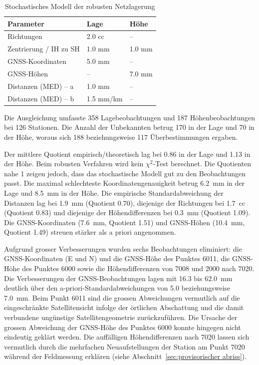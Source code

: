 \begin{table}[H]
    \centering
    \begin{tabularx}{\textwidth}{p{5.5cm} X X}
        \toprule
        Parameter & Lage & Höhe \\
        \midrule
        Richtungen & 2.0 cc & -- \\
        \addlinespace
        Zentrierung / IH zu SH & 1.0 mm & 1.0 mm \\
        \addlinespace
        GNSS-Koordinaten & 5.0 mm & -- \\
        \addlinespace
        GNSS-Höhen & -- & 7.0 mm \\
        \addlinespace
        Distanzen (MED) -- a & 1.0 mm & -- \\
        \addlinespace
        Distanzen (MED) -- b & 1.5 mm/km & -- \\
        \bottomrule
    \end{tabularx}
    \caption{Stochastisches Modell der robusten Netzlagerung}
    \label{tab:stochastisches-modell-robust}
\end{table}

Die Ausgleichung umfasste 358 Lagebeobachtungen und 187
Höhenbeobachtungen bei 126 Stationen. Die Anzahl der Unbekannten betrug 170
in der Lage und 70 in der Höhe, woraus sich 188 beziehungsweise 117
Überbestimmungen ergaben. \bigskip

Der mittlere Quotient empirisch/theoretisch lag
bei 0.86 in der Lage und 1.13 in der Höhe. Beim robusten Verfahren wird
kein $\chi^2$-Test berechnet. Die Quotienten nahe 1 zeigen jedoch, dass das
stochastische Modell gut zu den Beobachtungen passt. Die maximal
schlechteste Koordinatengenauigkeit betrug 6.2~mm in der Lage und 8.5~mm in
der Höhe. Die empirische Standardabweichung der Distanzen lag bei 1.9~mm
(Quotient 0.70), diejenige der Richtungen bei 1.7~cc (Quotient 0.83)  und
diejenige der Höhendifferenzen bei 0.3~mm (Quotient 1.09). Die
GNSS-Koordinaten (7.6~mm, Quotient 1.51) und GNSS-Höhen (10.4~mm,
Quotient 1.49) streuen stärker als a priori angenommen. \bigskip

Aufgrund grosser Verbesserungen wurden sechs Beobachtungen eliminiert:
die GNSS-Koordinaten (E und N) und die GNSS-Höhe des Punktes 6011, die
GNSS-Höhe des Punktes 6000 sowie die Höhendifferenzen von 7008 und 2000
nach 7020. Die Verbesserungen der GNSS-Beobachtungen lagen mit 16.3 bis
62.0~mm deutlich über den a-priori-Standardabweichungen von 5.0 beziehungsweise
7.0~mm. Beim Punkt 6011 sind die grossen Abweichungen vermutlich auf die
eingeschränkte Satellitensicht infolge der örtlichen Abschattung und die
damit verbundene ungünstige Satellitengeometrie zurückzuführen. Die Ursache
der grossen Abweichung der GNSS-Höhe des Punktes 6000 konnte hingegen nicht
eindeutig geklärt werden. Die auffälligen Höhendifferenzen nach 7020 lassen
sich vermutlich durch die mehrfachen Neuaufstellungen der Station am Punkt
7020 während der Feldmessung erklären (siehe Abschnitt~\ref{sec:provisorischer abriss}). \bigskip

